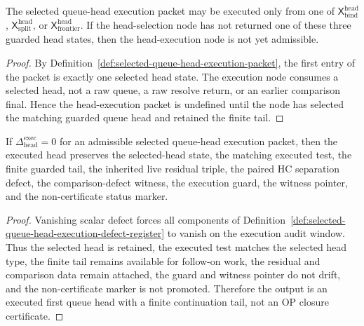 \begin{lemma}
\label{lem:selected-head-is-head-execution-precondition}
The selected queue-head execution packet may be executed only from one of \(\mathsf X_{\mathrm{bind}}^{\mathrm{head}}\), \(\mathsf X_{\mathrm{split}}^{\mathrm{head}}\), or \(\mathsf X_{\mathrm{frontier}}^{\mathrm{head}}\). If the head-selection node has not returned one of these three guarded head states, then the head-execution node is not yet admissible.
\end{lemma}

\begin{proof}
By Definition~\ref{def:selected-queue-head-execution-packet}, the first entry of the packet is exactly one selected head state. The execution node consumes a selected head, not a raw queue, a raw resolve return, or an earlier comparison final. Hence the head-execution packet is undefined until the node has selected the matching guarded queue head and retained the finite tail.
\end{proof}

\begin{lemma}
\label{lem:zero-selected-head-execution-defect-preserves-head-execution-data}
If \(\Delta_{\mathrm{head}}^{\mathrm{exec}}=0\) for an admissible selected queue-head execution packet, then the executed head preserves the selected-head state, the matching executed test, the finite guarded tail, the inherited live residual triple, the paired HC separation defect, the comparison-defect witness, the execution guard, the witness pointer, and the non-certificate status marker.
\end{lemma}

\begin{proof}
Vanishing scalar defect forces all components of Definition~\ref{def:selected-queue-head-execution-defect-register} to vanish on the execution audit window. Thus the selected head is retained, the executed test matches the selected head type, the finite tail remains available for follow-on work, the residual and comparison data remain attached, the guard and witness pointer do not drift, and the non-certificate marker is not promoted. Therefore the output is an executed first queue head with a finite continuation tail, not an OP closure certificate.
\end{proof}

